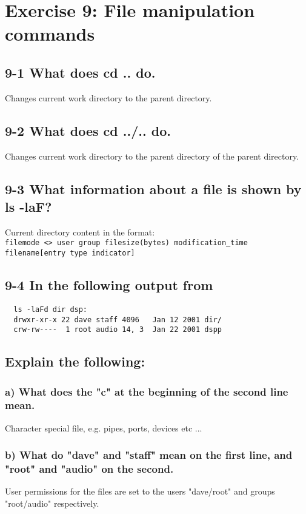 \section{Exercise 9: File manipulation commands}
\subsection{9-1 What does cd .. do.}
Changes current work directory to the parent directory.

\subsection{9-2 What does cd ../.. do.}
Changes current work directory to the parent directory of the parent directory.

\subsection{9-3 What information about a file is shown by ls -laF?}
Current directory content in the format:\\
\verb=filemode <> user group filesize(bytes) modification_time filename[entry type indicator]=

\subsection{9-4 In the following output from}
\begin{verbatim}
  ls -laFd dir dsp:
  drwxr-xr-x 22 dave staff 4096   Jan 12 2001 dir/
  crw-rw----  1 root audio 14, 3  Jan 22 2001 dspp
\end{verbatim}
\subsection{Explain the following:}
\subsubsection{a) What does the "c" at the beginning of the second line mean.}
Character special file, e.g. pipes, ports, devices etc ...

\subsubsection{b) What do "dave" and "staff" mean on the first line, and "root" and "audio" on the second.}
User permissions for the files are set to the users "dave/root" and groups "root/audio" respectively.

